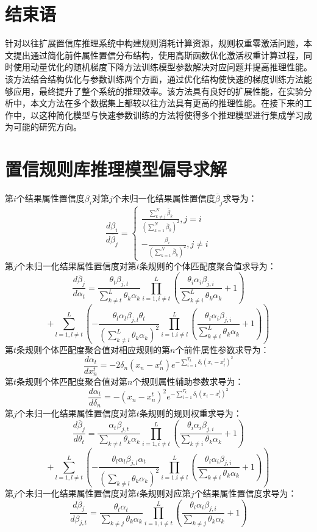 \documentclass{cjc}
\begin{document}
\section{结束语}
针对以往扩展置信库推理系统中构建规则消耗计算资源，规则权重零激活问题，本文提出通过简化前件属性置信分布结构，使用高斯函数优化激活权重计算过程，同时使用动量优化的随机梯度下降方法训练模型参数解决对应问题并提高推理性能。该方法结合结构优化与参数训练两个方面，通过优化结构使快速的梯度训练方法能够应用，最终提升了整个系统的推理效率。该方法具有良好的扩展性能，在实验分析中，本文方法在多个数据集上都较以往方法具有更高的推理性能。在接下来的工作中，以这种简化模型与快速参数训练的方法将使得多个推理模型进行集成学习成为可能的研究方向。


\nocite{*}




\newpage



\appendix

\section{置信规则库推理模型偏导求解}
\label{Appendix A}
第$i$个结果属性置信度$\beta_i$对第$j$个未归一化结果属性置信度$\overline{\beta}_j$求导为：
$$\frac{d\beta_i}{d\overline{\beta}_j}=
\left\{
\begin{aligned}
\frac{\sum_{k\neq j}^N\overline{\beta}_k}{(\sum_{k=1}^N\overline{\beta}_k)^2},j=i\\
-\frac{\beta_i}{(\sum_{k=1}^N\overline{\beta}_k)^2},j\neq i
\end{aligned}
\right.$$
第$j$个未归一化结果属性置信度对第$t$条规则的个体匹配度聚合值求导为：
$$\frac{d\overline{\beta}_j}{d\alpha_t}=\frac{\theta_t\beta_{j,t}}{\sum_{k\neq t}^L\theta_k\alpha_k}\prod_{i=1,i\neq t}^L(\frac{\theta_i\alpha_i\beta_{j,i}}{\sum_{k\neq i}^L{\theta_k\alpha_k}}+1)$$
$$+\sum_{l=1,l\neq t}^L(-\frac{\theta_l\alpha_l\beta_{j,l}\theta_t}{(\sum_{k\neq l}^L\theta_k\alpha_k)^2}\prod_{i=1.i\neq l}^L(\frac{\theta_i\alpha_i\beta_{j,i}}{\sum_{k\neq i}^L{\theta_k\alpha_k}}+1))$$
第$t$条规则个体匹配度聚合值对相应规则的第$n$个前件属性参数求导为：
$$\frac{d\alpha_t}{dx_n^t}=-2\delta_n(x_n-x_n^t)e^{-\sum_{i=1}^{T_k}\delta_i(x_i-x_i^t)^2}$$
第$t$条规则个体匹配度聚合值对第$n$个规则属性辅助参数求导为：
$$\frac{d\alpha_t}{d\delta_n}=-(x_n-x_n^t)^{2}e^{-\sum_{i=1}^{T_k}\delta_i(x_i-x_i^t)^2}$$
第$j$个未归一化结果属性置信度对第$t$条规则的规则权重求导为：
$$\frac{d\overline{\beta}_j}{d\theta_t}=\frac{\alpha_t\beta_{j,t}}{\sum_{k\neq t}\theta_k\alpha_k}\prod_{i=1,i\neq t}^L(\frac{\theta_i\alpha_i\beta_{j,i}}{\sum_{k\neq i}{\theta_k\alpha_k}}+1)$$
$$+\sum_{l=1,l\neq t}^L(-\frac{\theta_l\alpha_l\beta_{j,l}\alpha_t}{(\sum_{k\neq l}\theta_k\alpha_k)^2}\prod_{i=1.i\neq l}^L(\frac{\theta_i\alpha_i\beta_{j,i}}{\sum_{k\neq i}{\theta_k\alpha_k}}+1))$$
第$j$个未归一化结果属性置信度对第$t$条规则对应第$j$个结果属性置信度求导为：
$$\frac{d\overline{\beta}_j}{d\beta_{j,t}}=\frac{\theta_t\alpha_t}{\sum_{k\neq j}\theta_k\alpha_k}\prod_{i=1,i\neq t}^L(\frac{\theta_i\alpha_i\beta_{j,i}}{\sum_{k\neq j}\theta_k\alpha_k}+1)$$
\end{document}

